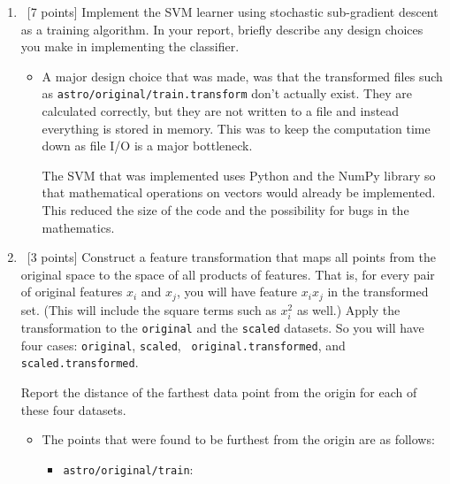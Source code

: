 \begin{enumerate}
\item ~[7 points] Implement the SVM learner using stochastic
  sub-gradient descent as a training algorithm. In your report,
  briefly describe any design choices you make in implementing the
  classifier.

\begin{itemize}
\item A major design choice that was made, was that the transformed files such as \verb~astro/original/train.transform~ don't actually exist. They are calculated correctly, but they are not written to a file and instead everything is stored in memory. This was to keep the computation time down as file I/O is a major bottleneck. 

The SVM that was implemented uses Python and the NumPy library so that mathematical operations on vectors would already be implemented. This reduced the size of the code and the possibility for bugs in the mathematics. 

\end{itemize}

\item ~[3 points] Construct a feature transformation that maps all
  points from the original space to the space of all products of
  features. That is, for every pair of original features $x_i$ and
  $x_j$, you will have feature $x_ix_j$ in the transformed set. (This
  will include the square terms such as $x_i^2$ as well.) Apply the
  transformation to the {\tt original} and the {\tt scaled} datasets.
  So you will have four cases: {\tt original}, {\tt scaled}, {\tt
    original.transformed}, and {\tt scaled.transformed}.

  Report the distance of the farthest data point from the origin for
  each of these four datasets.

\begin{itemize}
\item The points that were found to be furthest from the origin are as follows:
\begin{itemize}
  \item \verb~astro/original/train~: 


\end{itemize}
\end{itemize}
\end{enumerate}
